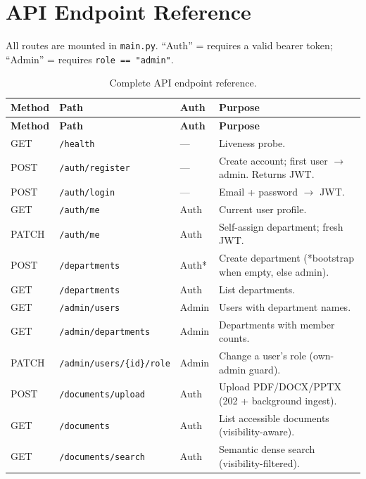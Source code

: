 \documentclass[11pt,a4paper,oneside]{report}
\newcommand{\code}[1]{\texttt{#1}}
\begin{document}
\chapter{API Endpoint Reference}
\label{app:api}
All routes are mounted in \code{main.py}. ``Auth'' = requires a valid bearer token; ``Admin'' = requires
\code{role == "admin"}.

\begin{small}
\begin{longtable}{|L{1.5cm}|L{4.8cm}|C{1.2cm}|L{6.4cm}|}
\caption{Complete API endpoint reference.}\label{tab:api}\\
\hline
{}
{\color{white}\textbf{Method}} & {\color{white}\textbf{Path}} & {\color{white}\textbf{Auth}} & {\color{white}\textbf{Purpose}}\\ \hline
\endfirsthead
\hline
{}
{\color{white}\textbf{Method}} & {\color{white}\textbf{Path}} & {\color{white}\textbf{Auth}} & {\color{white}\textbf{Purpose}}\\ \hline
\endhead
\hline
\endfoot
GET & \code{/health} & --- & Liveness probe.\\ \hline
POST & \code{/auth/register} & --- & Create account; first user $\to$ admin. Returns JWT.\\ \hline
POST & \code{/auth/login} & --- & Email + password $\to$ JWT.\\ \hline
GET & \code{/auth/me} & Auth & Current user profile.\\ \hline
PATCH & \code{/auth/me} & Auth & Self-assign department; fresh JWT.\\ \hline
POST & \code{/departments} & Auth* & Create department (*bootstrap when empty, else admin).\\ \hline
GET & \code{/departments} & Auth & List departments.\\ \hline
GET & \code{/admin/users} & Admin & Users with department names.\\ \hline
GET & \code{/admin/departments} & Admin & Departments with member counts.\\ \hline
PATCH & \code{/admin/users/\{id\}/role} & Admin & Change a user's role (own-admin guard).\\ \hline
POST & \code{/documents/upload} & Auth & Upload PDF/DOCX/PPTX (202 + background ingest).\\ \hline
GET & \code{/documents} & Auth & List accessible documents (visibility-aware).\\ \hline
GET & \code{/documents/search} & Auth & Semantic dense search (visibility-filtered).\\ \hline

\end{longtable}
\end{small}
\end{document}
